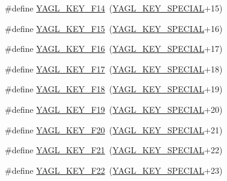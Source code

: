 \begin{DoxyCompactItemize}
\item 
\#define \hyperlink{group____consts__key__mouse_ga1e665cda06a6c7a903175c78c65a7bbf}{Y\-A\-G\-L\-\_\-\-K\-E\-Y\-\_\-\-F14}~(\hyperlink{group____consts__key__mouse_gae6060c5e0a8f15c67d28e1a1f0765d7b}{Y\-A\-G\-L\-\_\-\-K\-E\-Y\-\_\-\-S\-P\-E\-C\-I\-A\-L}+15)
\item 
\#define \hyperlink{group____consts__key__mouse_ga01168edc73c4ede3574450dcd9bcda67}{Y\-A\-G\-L\-\_\-\-K\-E\-Y\-\_\-\-F15}~(\hyperlink{group____consts__key__mouse_gae6060c5e0a8f15c67d28e1a1f0765d7b}{Y\-A\-G\-L\-\_\-\-K\-E\-Y\-\_\-\-S\-P\-E\-C\-I\-A\-L}+16)
\item 
\#define \hyperlink{group____consts__key__mouse_ga7815eca2c83b5b04481ad8eefff7abc9}{Y\-A\-G\-L\-\_\-\-K\-E\-Y\-\_\-\-F16}~(\hyperlink{group____consts__key__mouse_gae6060c5e0a8f15c67d28e1a1f0765d7b}{Y\-A\-G\-L\-\_\-\-K\-E\-Y\-\_\-\-S\-P\-E\-C\-I\-A\-L}+17)
\item 
\#define \hyperlink{group____consts__key__mouse_gaa8c1220394d4475a0b7e3acb5a98722a}{Y\-A\-G\-L\-\_\-\-K\-E\-Y\-\_\-\-F17}~(\hyperlink{group____consts__key__mouse_gae6060c5e0a8f15c67d28e1a1f0765d7b}{Y\-A\-G\-L\-\_\-\-K\-E\-Y\-\_\-\-S\-P\-E\-C\-I\-A\-L}+18)
\item 
\#define \hyperlink{group____consts__key__mouse_ga7a0da3b9cdaafa8cdc7964cb52436cc8}{Y\-A\-G\-L\-\_\-\-K\-E\-Y\-\_\-\-F18}~(\hyperlink{group____consts__key__mouse_gae6060c5e0a8f15c67d28e1a1f0765d7b}{Y\-A\-G\-L\-\_\-\-K\-E\-Y\-\_\-\-S\-P\-E\-C\-I\-A\-L}+19)
\item 
\#define \hyperlink{group____consts__key__mouse_ga69d0ecf978656d9c4eb2f6d65fdf8ef1}{Y\-A\-G\-L\-\_\-\-K\-E\-Y\-\_\-\-F19}~(\hyperlink{group____consts__key__mouse_gae6060c5e0a8f15c67d28e1a1f0765d7b}{Y\-A\-G\-L\-\_\-\-K\-E\-Y\-\_\-\-S\-P\-E\-C\-I\-A\-L}+20)
\item 
\#define \hyperlink{group____consts__key__mouse_ga399dc13c8195b30069717dcfa0cdb16c}{Y\-A\-G\-L\-\_\-\-K\-E\-Y\-\_\-\-F20}~(\hyperlink{group____consts__key__mouse_gae6060c5e0a8f15c67d28e1a1f0765d7b}{Y\-A\-G\-L\-\_\-\-K\-E\-Y\-\_\-\-S\-P\-E\-C\-I\-A\-L}+21)
\item 
\#define \hyperlink{group____consts__key__mouse_gafed930e087a2b1c080bb82cdc0e846cf}{Y\-A\-G\-L\-\_\-\-K\-E\-Y\-\_\-\-F21}~(\hyperlink{group____consts__key__mouse_gae6060c5e0a8f15c67d28e1a1f0765d7b}{Y\-A\-G\-L\-\_\-\-K\-E\-Y\-\_\-\-S\-P\-E\-C\-I\-A\-L}+22)
\item 
\#define \hyperlink{group____consts__key__mouse_gabf3dd9a6dd3663dc6315a47600e030e3}{Y\-A\-G\-L\-\_\-\-K\-E\-Y\-\_\-\-F22}~(\hyperlink{group____consts__key__mouse_gae6060c5e0a8f15c67d28e1a1f0765d7b}{Y\-A\-G\-L\-\_\-\-K\-E\-Y\-\_\-\-S\-P\-E\-C\-I\-A\-L}+23)

\end{DoxyCompactItemize}
